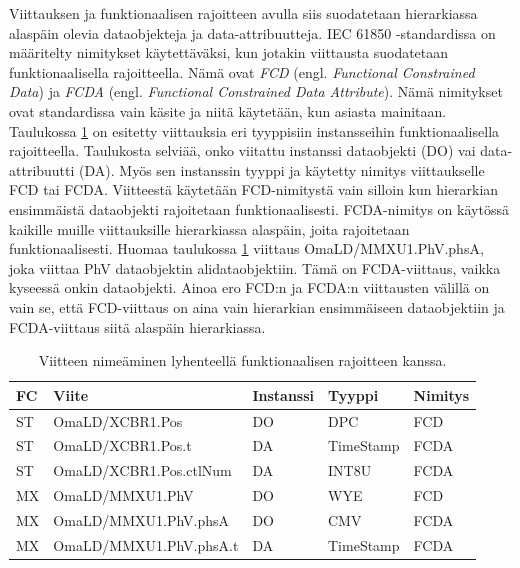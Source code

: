Viittauksen ja funktionaalisen rajoitteen avulla siis suodatetaan hierarkiassa alaspäin olevia dataobjekteja ja data-attribuutteja. IEC 61850 -standardissa on määritelty nimitykset käytettäväksi, kun jotakin viittausta suodatetaan funktionaalisella rajoitteella. Nämä ovat \emph{FCD} (engl. \emph{Functional Constrained Data}) ja \emph{FCDA} (engl. \emph{Functional Constrained Data Attribute}). Nämä nimitykset ovat standardissa vain käsite ja niitä käytetään, kun asiasta mainitaan. Taulukossa \ref{tab:fcd-ja-fcda} on esitetty viittauksia eri tyyppisiin instansseihin funktionaalisella rajoitteella. Taulukosta selviää, onko viitattu instanssi dataobjekti (DO) vai data-attribuutti (DA). Myös sen instanssin tyyppi ja käytetty nimitys viittaukselle FCD tai FCDA. Viitteestä käytetään FCD-nimitystä vain silloin kun hierarkian ensimmäistä dataobjekti rajoitetaan funktionaalisesti. FCDA-nimitys on käytössä kaikille muille viittauksille hierarkiassa alaspäin, joita rajoitetaan funktionaalisesti. Huomaa taulukossa \ref{tab:fcd-ja-fcda} viittaus OmaLD/MMXU1.PhV.phsA, joka viittaa PhV dataobjektin alidataobjektiin. Tämä on FCDA-viittaus, vaikka kyseessä onkin dataobjekti. Ainoa ero FCD:n ja FCDA:n viittausten välillä on vain se, että FCD-viittaus on aina vain hierarkian ensimmäiseen dataobjektiin ja FCDA-viittaus siitä alaspäin hierarkiassa. \mbox{\cite[s.~55]{IEC61850-7-2}} \mbox{\cite[s.~63]{IEC61850-8-1}}

\begin{table}[ht!]
	\caption{Viitteen nimeäminen lyhenteellä funktionaalisen rajoitteen kanssa.}
	\label{tab:fcd-ja-fcda}
	\begin{tabular}{l | l | l | l | l}
		\hline
		\textbf{FC} & \textbf{Viite} & \textbf{Instanssi} & \textbf{Tyyppi} & \textbf{Nimitys} \\
		\hline \hline
		ST & OmaLD/XCBR1.Pos & DO & DPC & FCD \\
		ST & OmaLD/XCBR1.Pos.t & DA & TimeStamp & FCDA \\
		ST & OmaLD/XCBR1.Pos.ctlNum & DA & INT8U & FCDA \\
		MX & OmaLD/MMXU1.PhV & DO & WYE & FCD \\
		MX & OmaLD/MMXU1.PhV.phsA & DO & CMV & FCDA \\
		MX & OmaLD/MMXU1.PhV.phsA.t & DA & TimeStamp & FCDA \\
		\hline
	\end{tabular}
\end{table}

